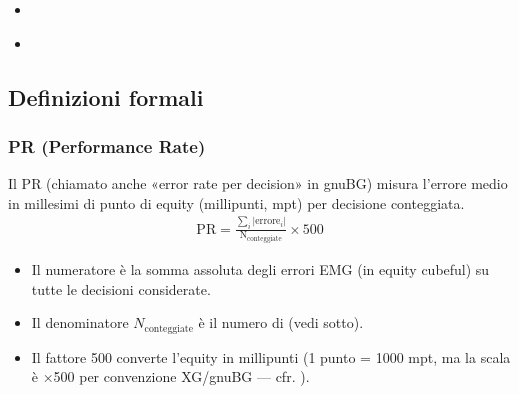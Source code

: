 \documentclass[letterpaper,10pt,italian]{sphinxmanual}
\begin{document}
\begin{sphinxcontents}
\begin{itemize}
\begin{itemize}
\item {} 
\sphinxAtStartPar
{}\label{\detokenize{stats_parity:id11}}{\hyperref[\detokenize{stats_parity:comparaison-gnubg-blunderdb-import-sgf-moteurs-differents}]{}}

\end{itemize}

\item {} 
\sphinxAtStartPar
{}\label{\detokenize{stats_parity:id12}}{\hyperref[\detokenize{stats_parity:valider-vos-propres-chiffres}]{}}

\item {} 
\sphinxAtStartPar
{}\label{\detokenize{stats_parity:id13}}{\hyperref[\detokenize{stats_parity:reference-gnubg}]{}}

\end{itemize}
\end{sphinxcontents}


\subsection{Definizioni formali}
\label{\detokenize{stats_parity:definitions-formelles}}

\subsubsection{PR (Performance Rate)}
\label{\detokenize{stats_parity:pr-performance-rate}}
\sphinxAtStartPar
Il PR (chiamato anche «error rate per decision» in gnuBG) misura l’errore medio in millesimi di punto di equity (millipunti, mpt) per decisione conteggiata.
\begin{equation*}
\begin{split}\mathrm{PR} = \frac{\sum_i |\mathrm{errore}_i|}{\mathrm{N_{conteggiate}}} \times 500\end{split}
\end{equation*}\begin{itemize}
\item {} 
\sphinxAtStartPar
Il numeratore è la somma assoluta degli errori EMG (in equity cubeful) su tutte le decisioni considerate.

\item {} 
\sphinxAtStartPar
Il denominatore \(N_\text{conteggiate}\) è il numero di  (vedi sotto).

\item {} 
\sphinxAtStartPar
Il fattore 500 converte l’equity in millipunti (1 punto = 1000 mpt, ma la scala è ×500 per convenzione XG/gnuBG — cfr. ).

\end{itemize}
\end{document}
